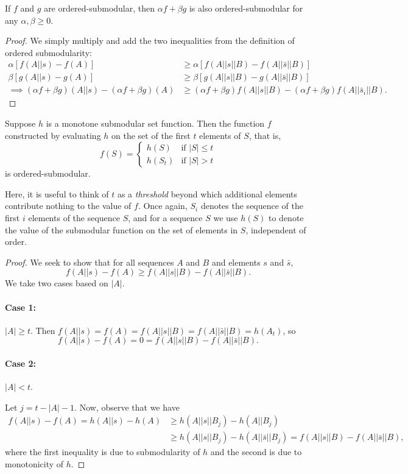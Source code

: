 \begin{lem} \label{lem:linear_combo}
If $f$ and $g$ are ordered-submodular, then $\alpha f+ \beta g$ is also ordered-submodular for any $\alpha, \beta \ge 0$.
\end{lem}
\begin{proof}
We simply multiply and add the two inequalities from the definition of ordered submodularity:
\begin{align*}
    \alpha \left[f(A || s) - f(A)\right] &\ge \alpha \left[f(A || s || B) - f(A || \bar{s} || B) \right] \\
    \beta \left[g(A || s) - g(A)\right] &\ge \beta \left[g(A || s || B) - g(A || \bar{s} || B) \right] \\
    \implies (\alpha f+ \beta g)(A||s) - (\alpha f+ \beta g)(A) &\ge (\alpha f+ \beta g)f(A || s || B) - (\alpha f+ \beta g)f(A || \bar{s}_i || B).
\end{align*}
\end{proof}

\begin{lem} \label{lem:threshold_submodular}
Suppose $h$ is a monotone submodular set function. Then the function $f$ constructed by evaluating $h$ on the set of the first $t$ elements of $S$, that is, 
$$f(S) = \begin{cases} h(S) & \text{if } |S| \le t \\
h(S_t) &\text{if } |S| > t \end{cases}$$
is ordered-submodular.
\end{lem}
Here, it is useful to think of $t$ as a \emph{threshold} beyond which additional elements contribute nothing to the value of $f$. Once again, $S_i$ denotes the sequence of the first $i$ elements of the sequence $S$, and for a sequence $S$ we use $h(S)$ to denote the value of the submodular function on the set of elements in $S$, independent of order.

\begin{proof}
We seek to show that for all sequences $A$ and $B$ and elements $s$ and $\bar{s}$, $$f(A||s)-f(A)\ge f(A|| s||B)-f(A||\bar s||B).$$ We take two cases based on $|A|$.

\paragraph{Case 1:} $|A| \ge t$.
Then $f(A || s) = f(A) = f(A||s||B) = f(A||\bar{s}||B) = h(A_t)$, so $$f(A||s) - f(A) = 0 = f(A||s||B) - f(A||\bar{s}||B).$$

\paragraph{Case 2:} $|A| < t$.

Let $j = t - |A| - 1$. Now, observe that we have
\begin{align*}
    f(A||s) - f(A) = h(A||s) - h(A) &\ge h(A||s||B_j) - h(A||B_j) \\
    &\ge h(A||s||B_j) - h(A||\bar{s}||B_j) = f(A||s||B) - f(A||\bar{s}||B),
\end{align*}
where the first inequality is due to submodularity of $h$ and the second is due to monotonicity of $h$.
\end{proof}

